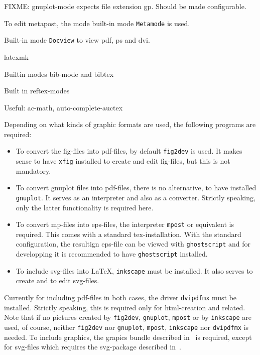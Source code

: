 \documentclass[12pt]{article}
\begin{document}
FIXME: gnuplot-mode expects file extension gp. 
Should be made configurable. 

To edit metapost, the mode built-in mode {\tt Metamode} is used. 

Built-in mode {\tt Docview} to view pdf, ps and dvi. 

latexmk

Builtin modes bib-mode and bibtex

Built in reftex-modes

Useful: 
ac-math, auto-complete-auctex

Depending on what kinds of graphic formats are used, 
the following programs are required: 
%
\begin{itemize}
\item
To convert the \gls{fig}-files into \gls{pdf}-files, 
by default {\tt fig2dev} is used. 
It makes sense to have {\tt xfig} installed 
to create and edit fig-files, but this is not mandatory. 
\item
To convert gnuplot files into pdf-files, there is no alternative, 
to have installed {\tt gnuplot}. 
It serves as an interpreter and also as a converter. 
Strictly speaking, only the latter functionality is required here. 
\item
To convert \gls{mp}-files into \gls{eps}-files, 
the interpreter {\tt mpost} or equivalent is required. 
This comes with a standard tex-installation. 
With the standard configuration, 
the resultign eps-file can be viewed with {\tt ghostscript} 
and for developping it is recommended to have {\tt ghostscript} installed. 
\item
To include \gls{svg}-files into \LaTeX{}, 
{\tt inkscape} must be installed. 
It also serves to create and to edit svg-files. 
\end{itemize}



Currently for including pdf-files in both cases, 
the driver {\tt dvipdfmx} must be installed. 
Strictly speaking, this is required only for html-creation and related. 
Note that if no pictures created by {\tt fig2dev}, {\tt gnuplot}, 
{\tt mpost} or by {\tt inkscape} are used, of course, 
neither {\tt fig2dev} nor {\tt gnuplot}, {\tt mpost}, {\tt inkscape} 
nor {\tt dvipdfmx} is needed. 
To include graphics, the grapics bundle described in~\cite{GraX} is required, 
except for svg-files which requires the svg-package 
described in~\cite{SvgP}. 
\end{document}
